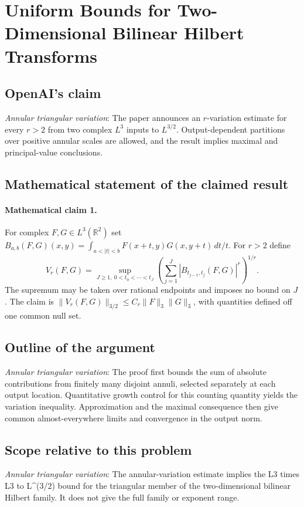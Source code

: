 \documentclass[11pt]{article}
\begin{document}
\section*{Uniform Bounds for Two-Dimensional Bilinear Hilbert Transforms}

\subsection{OpenAI's claim}
\textit{Annular triangular variation}: The paper announces an $r$-variation estimate for every $r>2$ from two complex $L^3$ inputs to $L^{3/2}$. Output-dependent partitions over positive annular scales are allowed, and the result implies maximal and principal-value conclusions.

\subsection{Mathematical statement of the claimed result}
\paragraph{Mathematical claim 1.} For complex $F,G\in L^3(\mathbb R^2)$ set $B_{a,b}(F,G)(x,y)=\int_{a<|t|<b}F(x+t,y)G(x,y+t)\,dt/t$. For $r>2$ define \[V_r(F,G)=\sup_{J\ge1,\ 0<t_0<\cdots<t_J}\left(\sum_{j=1}^J|B_{t_{j-1},t_j}(F,G)|^r\right)^{1/r}.\] The supremum may be taken over rational endpoints and imposes no bound on $J$. The claim is $\|V_r(F,G)\|_{3/2}\le C_r\|F\|_3\|G\|_3$, with quantities defined off one common null set.

\subsection{Outline of the argument}
\textit{Annular triangular variation}: The proof first bounds the sum of absolute contributions from finitely many disjoint annuli, selected separately at each output location. Quantitative growth control for this counting quantity yields the variation inequality. Approximation and the maximal consequence then give common almost-everywhere limits and convergence in the output norm.

\subsection{Scope relative to this problem}
\textit{Annular triangular variation}: The annular-variation estimate implies the L3 times L3 to L\textasciicircum{}(3/2) bound for the triangular member of the two-dimensional bilinear Hilbert family. It does not give the full family or exponent range.
\end{document}

